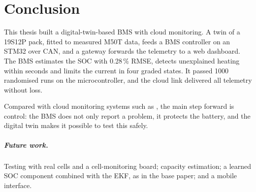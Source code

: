 \chapter{Conclusion}\label{ch:conclusion}

This thesis built a digital-twin-based BMS with cloud monitoring. A twin of a 19S12P pack, fitted to measured M50T data, feeds a BMS controller on an STM32 over CAN, and a gateway forwards the telemetry to a web dashboard. The BMS estimates the SOC with 0.28\,\% RMSE, detects unexplained heating within seconds and limits the current in four graded states. It passed 1000 randomised runs on the microcontroller, and the cloud link delivered all telemetry without loss.

Compared with cloud monitoring systems such as \citet{nejakar2025}, the main step forward is control: the BMS does not only report a problem, it protects the battery, and the digital twin makes it possible to test this safely.

\paragraph{Future work.} Testing with real cells and a cell-monitoring board; capacity estimation; a learned SOC component combined with the EKF, as in the base paper; and a mobile interface.
